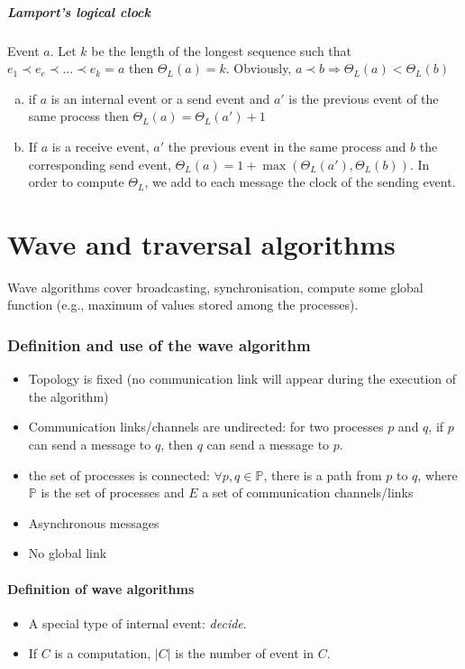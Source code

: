\subsubsection{Lamport's logical clock}
Event $a$.
Let $k$ be the length of the longest sequence such that $e_1 \prec e_e\prec ... \prec e_k=a$ then $\Theta_L(a)=k$. Obviously, $a\prec b \Rightarrow \Theta_L(a) < \Theta_L(b)$
\begin{enumerate}[a.]
\item if $a$ is an internal event or a send event and $a'$ is the previous event of the same process then $\Theta_L (a)=\Theta_L(a')+1$
\item If $a$ is a receive event, $a'$ the previous event in the same process and $b$ the corresponding send event, $\Theta_L(a) = 1 + \max (\Theta_L (a'), \Theta_L (b) )$. In order to compute $\Theta_L$, we add to each message the clock of the sending event.
\end{enumerate}

\newpage
\setcounter{section}{0}
\part{Wave and traversal algorithms}

Wave algorithms cover broadcasting, synchronisation, compute some global function (e.g., maximum of values stored among the processes).

\section{Definition and use of the wave algorithm}
\begin{itemize}
\item Topology is fixed (no communication link will appear during the execution of the algorithm)
\item Communication links/channels are undirected: for two processes $p$ and $q$, if $p$ can send a message to $q$, then $q$ can send a message to $p$.
\item the set of processes is connected: $\forall p,q \in \mathbb{P}$, there is a path from $p$ to $q$, where $\mathbb{P}$ is the set of processes and $E$ a set of communication channels/links
\item Asynchronous messages
\item No global link
\end{itemize}

\subsection{Definition of wave algorithms}
\begin{itemize}
\item A special type of internal event: \emph{decide}.
\item If $C$ is a computation, $|C|$ is the number of event in $C$.
\end{itemize}

